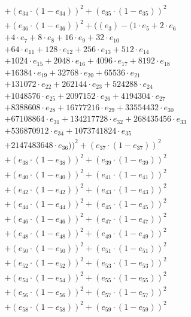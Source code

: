 \documentclass[10pt, a4paper]{article}
\begin{document}
\begin{small}
\begin{align*}
& + (e_{34} \cdot (1 - e_{34}))^{2} + (e_{35} \cdot (1 - e_{35}))^{2} \\
& + (e_{36} \cdot (1 - e_{36}))^{2} + ((e_{3}) - (1 \cdot e_{5} + 2 \cdot e_{6} \\
& + 4 \cdot e_{7} + 8 \cdot e_{8} + 16 \cdot e_{9} + 32 \cdot e_{10} \\
& + 64 \cdot e_{11} + 128 \cdot e_{12} + 256 \cdot e_{13} + 512 \cdot e_{14} \\
& + 1024 \cdot e_{15} + 2048 \cdot e_{16} + 4096 \cdot e_{17} + 8192 \cdot e_{18} \\
& + 16384 \cdot e_{19} + 32768 \cdot e_{20} + 65536 \cdot e_{21} \\
& + 131072 \cdot e_{22} + 262144 \cdot e_{23} + 524288 \cdot e_{24} \\
& + 1048576 \cdot e_{25} + 2097152 \cdot e_{26} + 4194304 \cdot e_{27} \\
& + 8388608 \cdot e_{28} + 16777216 \cdot e_{29} + 33554432 \cdot e_{30} \\
& + 67108864 \cdot e_{31} + 134217728 \cdot e_{32} + 268435456 \cdot e_{33} \\
& + 536870912 \cdot e_{34} + 1073741824 \cdot e_{35} \\
& + 2147483648 \cdot e_{36}))^{2} + (e_{37} \cdot (1 - e_{37}))^{2} \\
& + (e_{38} \cdot (1 - e_{38}))^{2} + (e_{39} \cdot (1 - e_{39}))^{2} \\
& + (e_{40} \cdot (1 - e_{40}))^{2} + (e_{41} \cdot (1 - e_{41}))^{2} \\
& + (e_{42} \cdot (1 - e_{42}))^{2} + (e_{43} \cdot (1 - e_{43}))^{2} \\
& + (e_{44} \cdot (1 - e_{44}))^{2} + (e_{45} \cdot (1 - e_{45}))^{2} \\
& + (e_{46} \cdot (1 - e_{46}))^{2} + (e_{47} \cdot (1 - e_{47}))^{2} \\
& + (e_{48} \cdot (1 - e_{48}))^{2} + (e_{49} \cdot (1 - e_{49}))^{2} \\
& + (e_{50} \cdot (1 - e_{50}))^{2} + (e_{51} \cdot (1 - e_{51}))^{2} \\
& + (e_{52} \cdot (1 - e_{52}))^{2} + (e_{53} \cdot (1 - e_{53}))^{2} \\
& + (e_{54} \cdot (1 - e_{54}))^{2} + (e_{55} \cdot (1 - e_{55}))^{2} \\
& + (e_{56} \cdot (1 - e_{56}))^{2} + (e_{57} \cdot (1 - e_{57}))^{2} \\
& + (e_{58} \cdot (1 - e_{58}))^{2} + (e_{59} \cdot (1 - e_{59}))^{2} \\

\end{align*}
\end{small}
\end{document}
